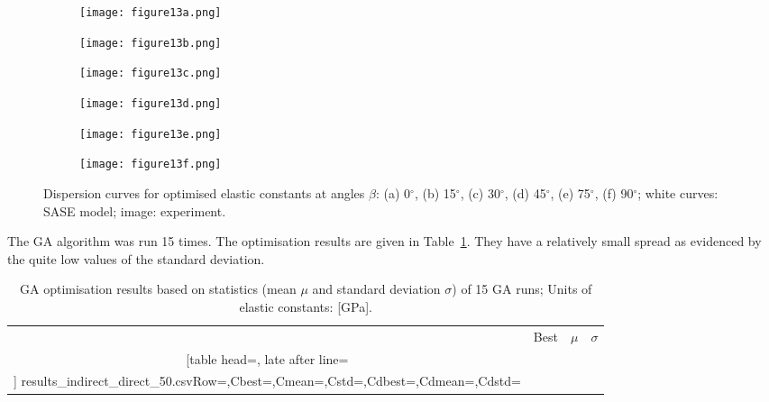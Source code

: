 \documentclass[preprint,12pt]{elsarticle}
\begin{document}
\begin{figure} [h!]
	\centering
	\begin{subfigure}[b]{0.47\textwidth}
		\centering
		\texttt{[image: figure13a.png]}
		\caption{}
		\label{fig:dispersion0deg_direct}
	\end{subfigure}
\hfill
	\begin{subfigure}[b]{0.47\textwidth}
		\centering
		\texttt{[image: figure13b.png]}
		\caption{}
		\label{fig:dispersion15deg_direct}
	\end{subfigure}
\hfill
	\begin{subfigure}[b]{0.47\textwidth}
		\centering
		\texttt{[image: figure13c.png]}
		\caption{}
		\label{fig:dispersion30deg_direct}
	\end{subfigure}
\hfill
	\begin{subfigure}[b]{0.47\textwidth}
		\centering
		\texttt{[image: figure13d.png]}
		\caption{}
		\label{fig:dispersion45deg_direct}
	\end{subfigure}
\hfill
	\begin{subfigure}[b]{0.47\textwidth}
		\centering
		\texttt{[image: figure13e.png]}
		\caption{}
		\label{fig:dispersion75deg_direct}
	\end{subfigure}
\hfill
	\begin{subfigure}[b]{0.47\textwidth}
		\centering
		\texttt{[image: figure13f.png]}
		\caption{}
		\label{fig:dispersion90deg_direct}
	\end{subfigure}
	\caption{Dispersion curves for optimised elastic constants at angles \(\beta\): (a) 0\(^{\circ}\), (b) 15\(^{\circ}\), (c) 30\(^{\circ}\), (d) 
	45\(^{\circ}\), 
	(e) 75\(^{\circ}\), (f) 90\(^{\circ}\); white curves: SASE model; image: experiment. }
	\label{fig:optimized_direct}
\end{figure}

The GA algorithm was run 15 times. 
The optimisation results are given in Table~\ref{tab:csv_results}.  
They have a relatively small spread as evidenced by the quite low values of the standard deviation. 
\begin{table}[h!]
	\renewcommand{\arraystretch}{1.3}
	\centering \footnotesize
	\caption{GA optimisation results based on statistics (mean \(\mu\) and standard 
		deviation \(\sigma\)) of 15 GA runs; Units of  elastic constants: [GPa].}	
	\begin{tabular}{crrr} \toprule
		&Best & \(\mu\) & \(\sigma\)\\
		\cmidrule{1-4} 
		\csvreader[table head=\toprule ,
		late after line=\\ ]%
		{results_indirect_direct_50.csv}{Row=\constants,Cbest=\cbest,Cmean=\cmean,Cstd=\cstd,Cdbest=\cdbest,Cdmean=\cdmean,Cdstd=\cdstd}%
		{\constants & \cdbest & \cdmean & \cdstd}%
		\bottomrule
	\end{tabular}	
	\label{tab:csv_results}
\end{table}
\end{document}
